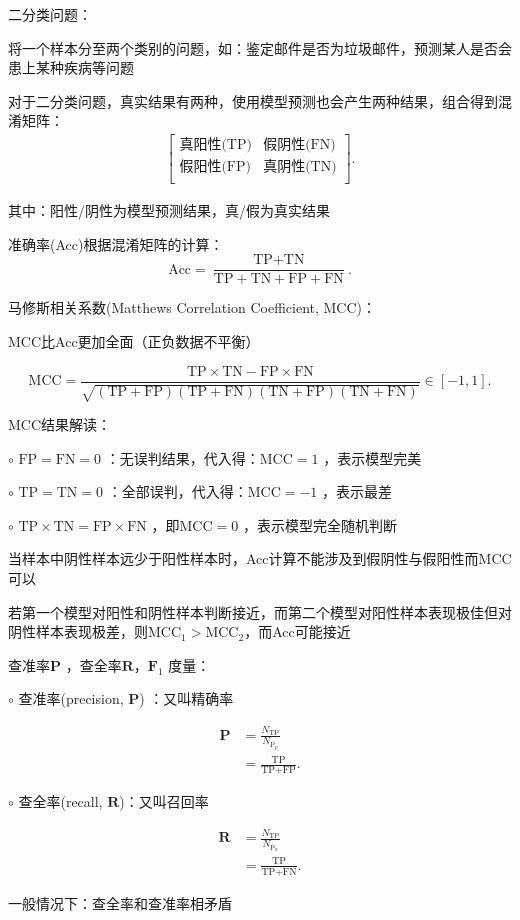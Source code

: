 \begin{notation}
    二分类问题：
    
    将一个样本分至两个类别的问题，如：鉴定邮件是否为垃圾邮件，预测某人是否会患上某种疾病等问题
\end{notation}
对于二分类问题，真实结果有两种，使用模型预测也会产生两种结果，组合得到混淆矩阵：
\begin{align*}
    \begin{bmatrix}
        \text{真阳性(TP)} & \text{假阴性(FN)}\\
        \text{假阳性(FP)} & \text{真阴性(TN)}\\
    \end{bmatrix}
.\end{align*}

其中：阳性/阴性为模型预测结果，真/假为真实结果

准确率(Acc)根据混淆矩阵的计算：
\[
    \text{Acc}=\frac{\text{TP}+\text{TN}}{\text{TP}+\text{TN}+\text{FP}+\text{FN}} 
.\] 
\begin{notation}
    马修斯相关系数(Matthews Correlation Coefficient, MCC)：

    MCC比Acc更加全面（正负数据不平衡）
\end{notation}
\[
    \text{MCC}=\frac{\text{TP}\times \text{TN}-\text{FP}\times \text{FN}}{\sqrt{\left( \text{TP}+\text{FP} \right) \left( \text{TP}+\text{FN} \right) \left( \text{TN}+\text{FP} \right) \left( \text{TN}+\text{FN} \right) } } \in [-1,1]
.\] 
\begin{notation}
    MCC结果解读：

    $\circ$ $\text{FP}=\text{FN}=0$ ：无误判结果，代入得：$\text{MCC}=1$ ，表示模型完美

    $\circ$ $\text{TP}=\text{TN}=0$ ：全部误判，代入得：$\text{MCC}=-1$ ，表示最差

    $\circ$ $\text{TP}\times \text{TN}=\text{FP}\times \text{FN}$ ，即$\text{MCC}=0$ ，表示模型完全随机判断

    当样本中阴性样本远少于阳性样本时，Acc计算不能涉及到假阴性与假阳性而MCC可以

    若第一个模型对阳性和阴性样本判断接近，而第二个模型对阳性样本表现极佳但对阴性样本表现极差，则$\text{MCC}_1>\text{MCC}_2$，而Acc可能接近
\end{notation}
\begin{notation}
    查准率$\bm{P}$ ，查全率$\bm{R}$，$\bm{F}_1$ 度量：
    
    $\circ$ 查准率(precision, $\bm{P}$) ：又叫精确率
\end{notation}
\begin{align*}
    \bm{P} &=\frac{N_\text{TP}}{N_{\text{P}_p}} \\
    &= \frac{\text{TP}}{\text{TP}+\text{FP}}
.\end{align*}
\begin{notation}
    $\circ$ 查全率(recall, $\bm{R}$)：又叫召回率
\end{notation}
\begin{align*}
    \bm{R}&= \frac{N_\text{TP}}{N_{\text{P}_a}}  \\
    &= \frac{\text{TP}}{\text{TP}+\text{FN}}
.\end{align*}

一般情况下：查全率和查准率相矛盾

